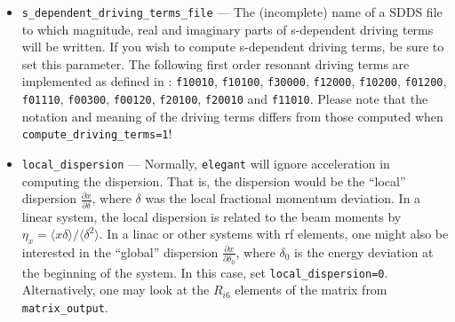 \documentclass[11pt]{article}
\begin{document}
\begin{itemize}
  over sextupole and quadrupole strengths are not computed. However, leading-order octupole terms are computed, even though they affect the same
  terms as the second-order sextupole and quadrupole terms. This option is provided because computing the higher-order terms is time-consuming and
  not always worthwhile.
\item \verb|s_dependent_driving_terms_file| --- The (incomplete) name of a SDDS file to which magnitude, real and imaginary parts of s-dependent driving terms will be written.
If you wish to compute s-dependent driving terms, be sure to set this parameter.
The following first order resonant driving terms are implemented as defined in \cite{sRDT}: {\tt f10010}, {\tt f10100}, 
{\tt f30000}, {\tt f12000}, {\tt f10200}, {\tt f01200}, {\tt f01110}, 
{\tt f00300}, {\tt f00120}, {\tt f20100}, {\tt f20010} and {\tt f11010}.
Please note that the notation and meaning of the driving terms differs from those computed when \verb|compute_driving_terms=1|!
\item \verb|local_dispersion| ---  Normally, {\tt elegant} will ignore acceleration in computing the
  dispersion.  That is, the dispersion would be the ``local'' dispersion $\frac{\partial x}{\partial \delta}$, where $\delta$
  was the local fractional momentum deviation.  In a linear system, the local dispersion is related to the
  beam moments by $\eta_x = \langle x \delta \rangle/\langle \delta^2 \rangle$.
  In a linac or other systems with rf elements, one might also be interested 
  in the ``global'' dispersion
  $\frac{\partial x}{\partial \delta_0}$, where $\delta_0$ is the energy deviation at the beginning of the system.
  In this case, set \verb|local_dispersion=0|.  Alternatively, one may look at the $R_{i6}$ elements of the matrix from 
  \verb|matrix_output|.
\end{itemize}
\end{document}
